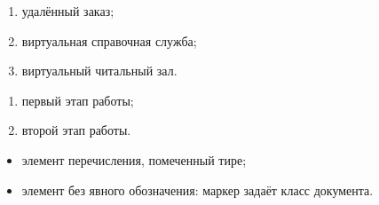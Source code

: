 \begin{enumerate}
  \item[а)] удалённый заказ;
  \item[б)] виртуальная справочная служба;
  \item[в)] виртуальный читальный зал.
\end{enumerate}

\begin{enumerate}
  \item[1)] первый этап работы;
  \item[2)] второй этап работы.
\end{enumerate}

\begin{itemize}
  \item[—] элемент перечисления, помеченный тире;
  \item элемент без явного обозначения: маркер задаёт класс документа.
\end{itemize}
